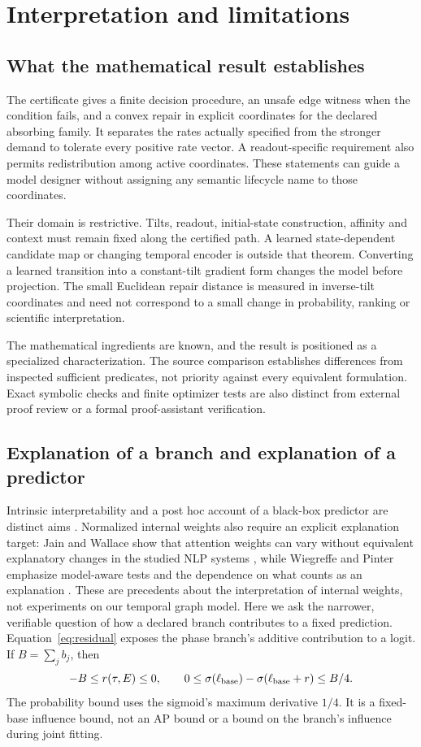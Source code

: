 \documentclass[pdflatex,sn-vancouver-num]{sn-jnl}
\theoremstyle{thmstyleone}
\begin{document}
\section{Interpretation and limitations}\label{sec:discussion}
\subsection{What the mathematical result establishes}
The certificate gives a finite decision procedure, an unsafe edge witness when the condition fails, and a convex repair in explicit coordinates for the declared absorbing family. It separates the rates actually specified from the stronger demand to tolerate every positive rate vector. A readout-specific requirement also permits redistribution among active coordinates. These statements can guide a model designer without assigning any semantic lifecycle name to those coordinates.

Their domain is restrictive. Tilts, readout, initial-state construction, affinity and context must remain fixed along the certified path. A learned state-dependent candidate map or changing temporal encoder is outside that theorem. Converting a learned transition into a constant-tilt gradient form changes the model before projection. The small Euclidean repair distance is measured in inverse-tilt coordinates and need not correspond to a small change in probability, ranking or scientific interpretation.

The mathematical ingredients are known, and the result is positioned as a specialized characterization. The source comparison establishes differences from inspected sufficient predicates, not priority against every equivalent formulation. Exact symbolic checks and finite optimizer tests are also distinct from external proof review or a formal proof-assistant verification.

\subsection{Explanation of a branch and explanation of a predictor}
Intrinsic interpretability and a post hoc account of a black-box predictor are distinct aims \cite{rudin}. Normalized internal weights also require an explicit explanation target: Jain and Wallace show that attention weights can vary without equivalent explanatory changes in the studied NLP systems \cite{attention}, while Wiegreffe and Pinter emphasize model-aware tests and the dependence on what counts as an explanation \cite{attentiontests}. These are precedents about the interpretation of internal weights, not experiments on our temporal graph model. Here we ask the narrower, verifiable question of how a declared branch contributes to a fixed prediction.
Equation~\eqref{eq:residual} exposes the phase branch's additive contribution to a logit. If $B=\sum_j b_j$, then
\begin{equation}\label{eq:influence}
-B\le r(\tau,E)\le0,\qquad
0\le\sigma(\ell_{\rm base})-\sigma(\ell_{\rm base}+r)\le B/4.
\end{equation}
The probability bound uses the sigmoid's maximum derivative $1/4$. It is a fixed-base influence bound, not an AP bound or a bound on the branch's influence during joint fitting.
\end{document}
